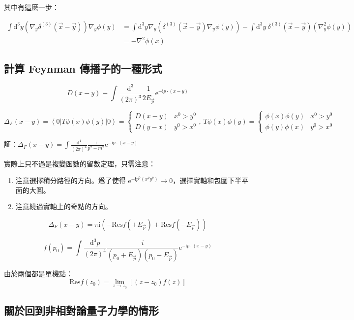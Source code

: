 \documentclass{article}
\begin{document}
其中有這麽一步：

$$\begin{aligned}
    \int\mathrm{d}^3y\left(\nabla_y\delta^{(3)}(\vec{x}-\vec{y})\right)\nabla_y\phi(y) & =\int\mathrm{d}^3y\nabla_y\left(\delta^{(3)}(\vec{x}-\vec{y})\nabla_y\phi(y)\right)-\int\mathrm{d}^3y\ \delta^{(3)}(\vec{x}-\vec{y})\left(\nabla_y^2\phi(y)\right) \\
                                                                                       & =-\nabla^2\phi(x)
  \end{aligned}$$

\subsection{計算 Feynman 傳播子的一種形式}

$$D(x-y)\equiv\int\frac{\mathrm{d}^3}{(2\pi)^3}\frac{1}{2E_{\vec{p}}}\mathrm{e}^{-\mathrm{i}p\cdot(x-y)}$$

$$\Delta_F(x-y)=\left\langle0\right|T\phi(x)\phi(y)\left|0\right\rangle=\begin{cases}
    D(x-y) & x^0>y^0 \\
    D(y-x) & y^0>x^0
  \end{cases},\ T\phi(x)\phi(y)=\begin{cases}
    \phi(x)\phi(y) & x^0>y^0 \\
    \phi(y)\phi(x) & y^0>x^0
  \end{cases}$$

証：$\Delta_F(x-y)=\int\frac{\mathrm{d}^4}{(2\pi)^4}\frac{\mathrm{i}}{p^2-m^2}\mathrm{e}^{-\mathrm{i}p\cdot(x-y)}$

實際上只不過是複變函數的留數定理，只需注意：\begin{enumerate}
  \item 注意選擇積分路徑的方向。爲了使得 $\mathrm{e}^{-\mathrm{i}p^0(x^py^p)}\to 0$，選擇實軸和包圍下半平面的大圓。
  \item 注意繞過實軸上的奇點的方向。
\end{enumerate}

$$\Delta_F(x-y)=\pi\mathrm{i}\left(-\mathrm{Res}f(+E_{\vec{p}})+\mathrm{Res}f(-E_{\vec{p}})\right)$$

$$f(p_0)=\int\frac{\mathrm{d}^3p}{(2\pi)^4}\frac{i}{(p_0+E_{\vec{p}})(p_0-E_{\vec{p}})}\mathrm{e}^{-\mathrm{i}p\cdot(x-y)}$$

由於兩個都是單機點：$$\mathrm{Res}f(z_0)=\lim_{z\to z_0}[(z-z_0)f(z)]$$

\subsection{關於回到非相對論量子力學的情形}
\end{document}
